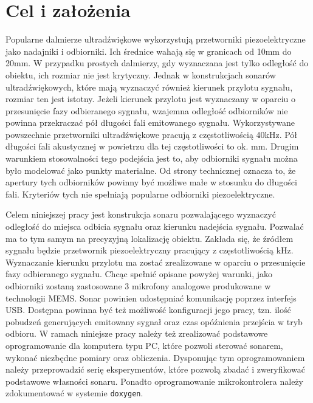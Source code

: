 \chapter{Cel i założenia}\label{chapter:ch_02}

Popularne dalmierze ultradźwiękowe wykorzystują przetworniki piezoelektryczne
jako nadajniki i odbiorniki. Ich średnice wahają się w granicach
od 10mm do 20mm.
W przypadku prostych dalmierzy, gdy wyznaczana jest tylko odległość do
obiektu, ich rozmiar nie jest krytyczny.
Jednak w konstrukcjach sonarów ultradźwiękowych, które mają wyznaczyć
również kierunek przylotu sygnału, rozmiar ten jest istotny.
Jeżeli kierunek przylotu jest wyznaczany w oparciu o przesunięcie
fazy odbieranego sygnału, wzajemna odległość odbiorników nie powinna
przekraczać pół długości fali emitowanego sygnału.
Wykorzystywane powszechnie przetworniki ultradźwiękowe pracują z częstotliwością
40kHz. Pół długości fali akustycznej w powietrzu dla tej częstotliwości
to ok. \unit[4,3]{mm}. Drugim warunkiem stosowalności tego podejścia
jest to, aby odbiorniki sygnału można było modelować jako punkty materialne.
Od strony technicznej oznacza to, że apertury tych odbiorników powinny być
możliwe małe w stosunku do długości fali.
Kryteriów tych nie spełniają popularne odbiorniki piezoelektryczne.

Celem niniejszej pracy jest konstrukcja sonaru pozwalającego wyznaczyć
odległość do miejsca odbicia sygnału oraz kierunku nadejścia sygnału.
Pozwalać ma to tym samym na precyzyjną lokalizację obiektu.
Zakłada się, że źródłem sygnału będzie przetwornik piezoelektryczny
pracujący z częstotliwością \unit[40]{kHz}.
Wyznaczanie kierunku przylotu ma zostać zrealizowane w oparciu
o przesunięcie fazy odbieranego sygnału. Chcąc spełnić opisane powyżej
warunki, jako odbiorniki zostaną zastosowane 3 mikrofony analogowe
produkowane w technologii MEMS.
Sonar powinien udostępniać komunikację poprzez interfejs USB.
Dostępna powinna być też możliwość konfiguracji jego pracy,
tzn. ilość pobudzeń generujących emitowany sygnał oraz czas opóźnienia
przejścia w tryb odbioru.
W ramach niniejsze pracy należy też zrealizować podstawowe oprogramowanie
dla komputera typu PC, które pozwoli sterować sonarem, wykonać
niezbędne pomiary oraz obliczenia. Dysponując tym oprogramowaniem
należy przeprowadzić serię eksperymentów, które pozwolą zbadać i zweryfikować
podstawowe własności sonaru. Ponadto oprogramowanie mikrokontrolera
należy zdokumentować w systemie {\tt doxygen}.
